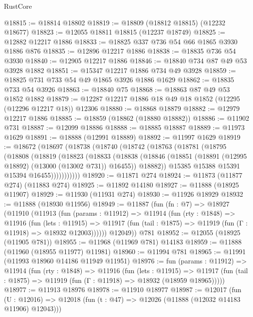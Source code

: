 \begin{lexlean}{RustCore}
\begin{coremodule}
@18815 := @18814 @18802
@18819 := @18809 (@18812 @18815) (@12232 @18677)
@18823 := @12055 @18811 @18815 (@12237 @18749)
@18825 := @12882 @12217 @1886
@18833 := @18825 @337 @736 @54 @66 @1865 @3930 @1886 @876
@18835 := @12896 @12217 @1886
@18838 := @18835 @736 @54 @3930
@18840 := @12905 @12217 @1886
@18846 := @18840 @734 @87 @49 @53 @3928 @1882
@18851 := @15347 @12217 @1886 @734 @49 @3928
@18859 := @18825 @731 @733 @54 @49 @1865 @3926 @1886 @1629
@18862 := @18835 @733 @54 @3926
@18863 := @18840 @75
@18868 := @18863 @87 @49 @53 @1852 @1882
@18879 := @12287 @12217 @1886 @18 @49 @18 @1852 (@12295 (@12296 @12217 @18)) @12306
@18880 := @18868 @18879
@18882 := @12979 @12217 @1886
@18885 := @18859 (@18862 (@18880 @18882))
@18886 := @11902 @731
@18887 := @12099 @18886
@18888 := @18885 @18887
@18889 := @11973 @1629
@18891 := @18888 (@12991 @18889)
@18892 := @11997 @1629
@18919 := @18672
    (@18697
      (@18738
        (@18740
          (@18742
            (@18763
              (@18781
                (@18795
                  (@18808
                    (@18819
                      (@18823
                        (@18833
                          (@18838
                            (@18846
                              (@18851 (@18891 (@12995 @18892) (@13000 (@13002 @731)) @16455))
                              @18882))
                          @15385
                          @15388
                          @15391
                          @15394
                          @16455)))))))))))
@18920 := @11871 @274
@18924 := @11873 (@11877 @274) (@11883 @274)
@18925 := @11892 @14180
@18927 := @11888 (@18925 @11907)
@18929 := @11930 (@11931 @274)
@18930 := @11926 @18929
@18932 := @11888 (@18930 @11956)
@18949 := @11887
    (fun (fn : @7) =>
    @18927
      (@11910
        (@11913
          (fun (params : @11912) =>
          @11914
            (fun (rty : @1848) =>
            @11916
              (fun (lets : @11915) =>
              @11917 (fun (tail : @1875) => @11919 (fun (Γ : @11918) => @18932 @12003))))))
        @12049))
    @781
@18952 := @12055 (@18925 (@11905 @781))
@18955 := @11968 (@11969 @781) @14183
@18959 := @11888 (@11960 (@18955 @11977) @11981)
@18960 := @11994 @781
@18965 := @11991 (@11993 @18960 @14186 @11949 @11951)
@18976 := fun (params : @11912) =>
  @11914
    (fun (rty : @1848) =>
    @11916
      (fun (lets : @11915) =>
      @11917 (fun (tail : @1875) => @11919 (fun (Γ : @11918) => @18932 (@18959 @18965)))))
@18977 := @11913 @18976
@18978 := @11910 @18977
@18987 := @12017
    (fun (U : @12016) => @12018 (fun (t : @47) => @12026 (@11888 (@12032 @14183 @11906) @12043)))

\end{coremodule}
\end{lexlean}
